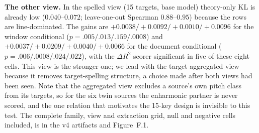 \documentclass[11pt]{article}
\begin{document}
\begin{resultbox}
\textbf{The other view.} In the spelled view (15 targets, base model) theory-only KL is already low ($0.040$--$0.072$; leave-one-out Spearman $0.88$--$0.95$) because the rows are line-dominated. The gains are $+0.0038/{+}0.0092/{+}0.0010/{+}0.0096$ for the window conditional ($p=.005/.013/.159/.0008$) and $+0.0037/{+}0.0209/{+}0.0040/{+}0.0066$ for the document conditional ($p=.006/.0008/.024/.022$), with the $\Delta R^2$ scorer significant in five of these eight cells. This view is the stronger one; we lead with the target-aggregated view because it removes target-spelling structure, a choice made after both views had been seen. Note that the aggregated view excludes a source's own pitch class from its targets, so for the six twin sources the enharmonic partner is never scored, and the one relation that motivates the 15-key design is invisible to this test. The complete family, view and extraction grid, null and negative cells included, is in the v4 artifacts and Figure~F.1.
\end{resultbox}
\end{document}

